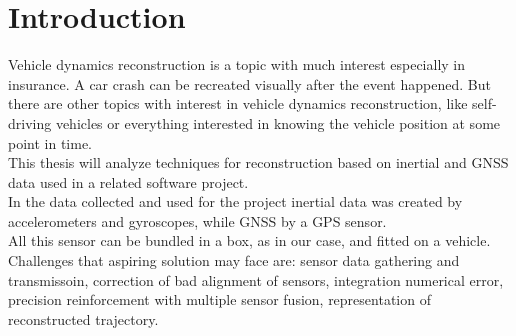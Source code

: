 \chapter{Introduction}
\label{chap:intro}

Vehicle dynamics reconstruction is a topic with much interest especially in insurance. A car crash can be recreated visually after the event happened. But there are other topics with interest in vehicle dynamics reconstruction, like self-driving vehicles or everything interested in knowing the vehicle position at some point in time. \\
This thesis will analyze techniques for reconstruction based on inertial and GNSS data used in a related software project. \\
In the data collected and used for the project inertial data was created by accelerometers and gyroscopes, while GNSS by a GPS sensor. \\
All this sensor can be bundled in a box, as in our case, and fitted on a vehicle. \\


Challenges that aspiring solution may face are: sensor data gathering and transmissoin, correction of bad alignment of sensors, integration numerical error, precision reinforcement with multiple sensor fusion, representation of reconstructed trajectory.

